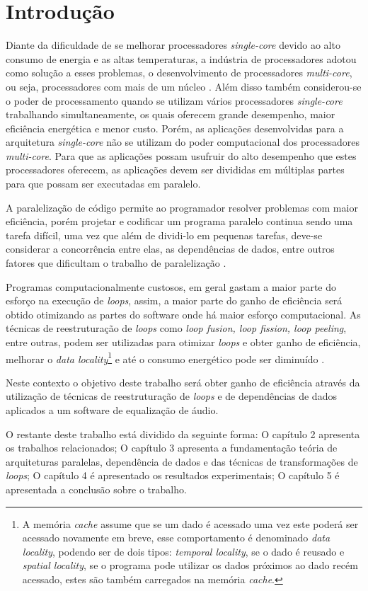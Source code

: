 \chapter{Introdução}

Diante da  dificuldade de se melhorar processadores \textit{single-core} devido 
ao alto consumo de energia e as altas temperaturas, a indústria de processadores 
adotou como solução a esses problemas, o desenvolvimento de processadores 
\textit{multi-core}, ou seja, processadores com mais de um núcleo \cite{aapc}. 
Além disso também considerou-se o poder de processamento 
quando se utilizam vários processadores \textit{single-core} trabalhando 
simultaneamente, os quais oferecem grande desempenho, maior eficiência energética 
e menor custo.
Porém, as aplicações desenvolvidas para a arquitetura \textit{single-core} não 
se utilizam do poder computacional dos processadores \textit{multi-core}.
Para que as aplicações possam usufruir do alto desempenho que estes processadores 
oferecem, as aplicações devem ser divididas em múltiplas partes para que possam 
ser executadas em paralelo.

A paralelização de código permite ao programador resolver problemas com maior 
eficiência, porém projetar e codificar um programa paralelo continua sendo uma 
tarefa difícil, uma vez que além de dividi-lo em pequenas tarefas, deve-se 
considerar a concorrência entre elas, as dependências de dados, entre outros 
fatores que dificultam o trabalho de paralelização \cite{aipp}.

Programas computacionalmente custosos, em geral gastam a maior parte do esforço 
na execução de \textit{loops}, assim, a maior parte do ganho de eficiência será
obtido otimizando as partes do software onde há maior esforço computacional.
As técnicas de reestruturação de \textit{loops} como \textit{loop 
fusion, loop fission, loop peeling}, entre outras, podem ser utilizadas para
otimizar \textit{loops} e obter ganho de eficiência, melhorar o 
\textit{data locality}\footnote{A
        memória \textit{cache} assume que se um dado é acessado uma vez este 
        poderá ser acessado novamente em breve, esse comportamento é denominado 
        \textit{data locality}, podendo ser de dois tipos:
        \textit{temporal locality}, se o
        dado é reusado e \textit{spatial locality}, se o programa pode utilizar
        os dados próximos ao dado recém acessado, estes são também carregados
        na memória \textit{cache}.
}
e até o consumo energético pode ser diminuído \cite{Liu:2004}.

Neste contexto o objetivo deste trabalho será obter ganho de eficiência através da 
utilização de técnicas de reestruturação de \textit{loops} e de dependências de 
dados aplicados a um software de equalização de áudio.

O restante deste trabalho está dividido da seguinte forma: O capítulo 2
  apresenta os trabalhos relacionados; O capítulo 3
  apresenta a fundamentação teória de arquiteturas paralelas, dependência de
  dados e das técnicas de transformações de \textit{loops}; O capítulo 4 é  
  apresentado os resultados experimentais; O capítulo 5 é apresentada a 
  conclusão sobre o trabalho.
